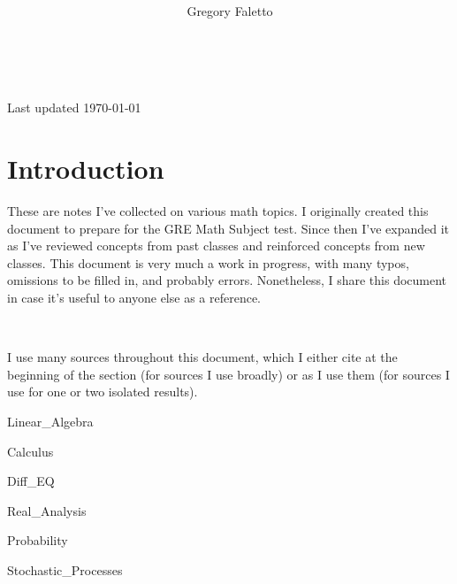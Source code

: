 \documentclass{article}
\title{
    \vspace{2in}
    \textmd{\textbf{ \hmwkTitle}}\\
}
\author{Gregory Faletto}
\date{}
\numberwithin{equation}{section}
\theoremstyle{definition}
\numberwithin{theorem}{subsection}
\theoremstyle{definition}
\theoremstyle{definition}
\theoremstyle{definition}
\theoremstyle{definition}
\theoremstyle{definition}
\theoremstyle{definition}
\begin{document}
\maketitle

\pagebreak

\tableofcontents

\


\begin{center}
Last updated \today
\end{center}



\newpage

\section{Introduction}

These are notes I've collected on various math topics. I originally created this document to prepare for the GRE Math Subject test. Since then I've expanded it as I've reviewed concepts from past classes and reinforced concepts from new classes. This document is very much a work in progress, with many typos, omissions to be filled in, and probably errors. Nonetheless, I share this document in case it's useful to anyone else as a reference.

\

I use many sources throughout this document, which I either cite at the beginning of the section (for sources I use broadly) or as I use them (for sources I use for one or two isolated results).

\pagebreak

{Linear_Algebra}

\pagebreak

{Calculus}

\pagebreak

{Diff_EQ}

\pagebreak

{Real_Analysis}

\pagebreak

{Probability}

\pagebreak

{Stochastic_Processes}

\pagebreak
\end{document}
